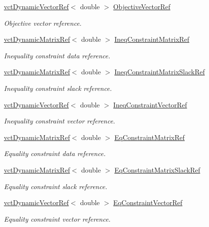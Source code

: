 \begin{DoxyCompactItemize}
\hyperlink{classvct_dynamic_vector_ref}{vct\+Dynamic\+Vector\+Ref}$<$ double $>$ \hyperlink{classmts_v_f_base_a3eb71862ba4f3e84334626da145500b8}{Objective\+Vector\+Ref}
\begin{DoxyCompactList}\small\item\em Objective vector reference. \end{DoxyCompactList}\item 
\hyperlink{classvct_dynamic_matrix_ref}{vct\+Dynamic\+Matrix\+Ref}$<$ double $>$ \hyperlink{classmts_v_f_base_a5a7e70da8b7af5531051a347c5cf8a7a}{Ineq\+Constraint\+Matrix\+Ref}
\begin{DoxyCompactList}\small\item\em Inequality constraint data reference. \end{DoxyCompactList}\item 
\hyperlink{classvct_dynamic_matrix_ref}{vct\+Dynamic\+Matrix\+Ref}$<$ double $>$ \hyperlink{classmts_v_f_base_ae6d2107122aa85ffe1422877d3738e92}{Ineq\+Constraint\+Matrix\+Slack\+Ref}
\begin{DoxyCompactList}\small\item\em Inequality constraint slack reference. \end{DoxyCompactList}\item 
\hyperlink{classvct_dynamic_vector_ref}{vct\+Dynamic\+Vector\+Ref}$<$ double $>$ \hyperlink{classmts_v_f_base_a630a27c6fd52487f0981d6c6fa273823}{Ineq\+Constraint\+Vector\+Ref}
\begin{DoxyCompactList}\small\item\em Inequality constraint vector reference. \end{DoxyCompactList}\item 
\hyperlink{classvct_dynamic_matrix_ref}{vct\+Dynamic\+Matrix\+Ref}$<$ double $>$ \hyperlink{classmts_v_f_base_a2e4890accf54786167b72ab807a6c9d9}{Eq\+Constraint\+Matrix\+Ref}
\begin{DoxyCompactList}\small\item\em Equality constraint data reference. \end{DoxyCompactList}\item 
\hyperlink{classvct_dynamic_matrix_ref}{vct\+Dynamic\+Matrix\+Ref}$<$ double $>$ \hyperlink{classmts_v_f_base_afba44d1e55c4d6a1885b80f19007a3fa}{Eq\+Constraint\+Matrix\+Slack\+Ref}
\begin{DoxyCompactList}\small\item\em Equality constraint slack reference. \end{DoxyCompactList}\item 
\hyperlink{classvct_dynamic_vector_ref}{vct\+Dynamic\+Vector\+Ref}$<$ double $>$ \hyperlink{classmts_v_f_base_af88966d5b41b80821adb2d69ec8d0fa9}{Eq\+Constraint\+Vector\+Ref}
\begin{DoxyCompactList}\small\item\em Equality constraint vector reference. \end{DoxyCompactList}\end{DoxyCompactItemize}
